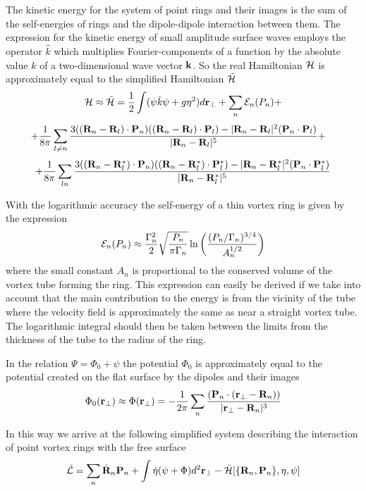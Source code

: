 The kinetic energy for the system of point rings and their images is 
the sum of the self-energies of rings and the dipole-dipole interaction between 
them. The expression for the kinetic energy of small amplitude surface waves 
employs the operator $\hat k$ which multiplies Fourier-components of 
a function by the absolute value $k$ of a two-dimensional wave vector ${\bf k}$.
So the real Hamiltonian ${\cal H}$ is approximately equal to the simplified 
Hamiltonian $\tilde{\cal H}$
$$
{\cal H}\approx\tilde{\cal H}=
\frac{1}{2}\int(\psi\hat k \psi+g\eta^2)d{\bf r}_{\bot}
+\sum_n {\cal E}_n(P_n)+
$$
$$
+\frac{1}{8\pi}\sum_{l\not= n}
\frac{3(({\bf R}_n-{\bf R}_l)\cdot{\bf P}_n)
(({\bf R}_n-{\bf R}_l)\cdot{\bf P}_l)-
|{\bf R}_n-{\bf R}_l|^2({\bf P}_n\cdot{\bf P}_l)}
{|{\bf R}_n-{\bf R}_l|^5}+\quad
$$
\begin{equation}
+\frac{1}{8\pi}\sum_{l n}
\frac{3(({\bf R}_n-{\bf R}^*_l)\cdot{\bf P}_n)
(({\bf R}_n-{\bf R}^*_l)\cdot{\bf P}^*_l)-
|{\bf R}_n-{\bf R}^*_l|^2({\bf P}_n\cdot{\bf P}^*_l)}
{|{\bf R}_n-{\bf R}^*_l|^5}
\end{equation}

With the logarithmic accuracy the self-energy of a thin vortex ring is given 
by the expression
\begin{equation}
{\cal E}_n(P_n)\approx\frac{\Gamma_n^2}{2}
\sqrt{\frac{P_n}{\pi\Gamma_n}}
\ln\left(\frac{(P_n/\Gamma_n)^{3/4}}{A_n^{1/2}}\right)
\end{equation}
where the small constant $A_n$ is proportional to the conserved volume of 
the vortex tube forming the ring. This expression can easily be derived if we 
take into account that the main contribution to the energy is from the 
vicinity of the tube where the velocity field is approximately the same as near a 
straight vortex tube. The logarithmic integral  should then be taken between the 
limits from the thickness of the tube to the radius of the ring.

In the relation $\Psi=\Phi_0+\psi$ the potential $\Phi_0$ is approximately equal 
to the potential created on the flat surface by the dipoles and their images
\begin{equation}
\Phi_0({\bf r}_\bot)\approx\Phi({\bf r}_\bot)=
-\frac{1}{2\pi}\sum_n
\frac{({\bf P}_n\cdot({\bf r}_\bot-{\bf R}_n))}
{|{\bf r}_\bot-{\bf R}_n|^3}
\end{equation}

In this way we arrive at the following simplified system describing 
the interaction of point vortex rings with the free surface
\begin{equation}\label{tildeL}
\tilde{\cal L}=\sum_n \dot{\bf R}_n{\bf P}_n+
\int \dot\eta(\psi+\Phi)d^2{\bf r}_\bot-
\tilde{\cal H}[\{{\bf R}_n,{\bf P}_n\},\eta,\psi]
\end{equation}

